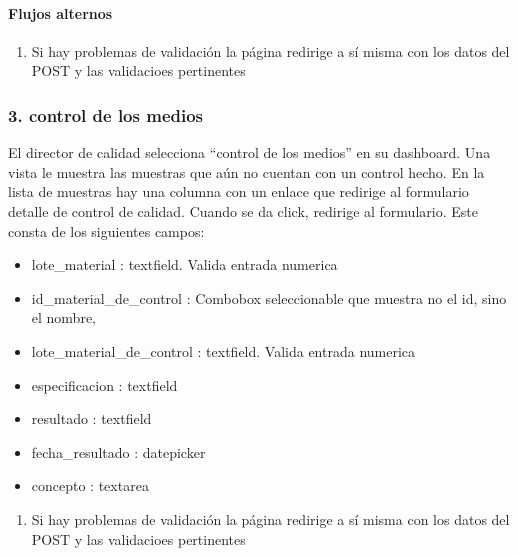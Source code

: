 \documentclass[letterpaper,10pt,spanish]{sphinxmanual}
\begin{document}
\paragraph{Flujos alternos}
\label{\detokenize{requerimientos/srs:id1}}\begin{enumerate}
%
\item {} 
Si hay problemas de validación la página redirige a sí misma con
los datos del POST y las validacioes pertinentes

\end{enumerate}


\subsubsection{3. control de los medios}
\label{\detokenize{requerimientos/srs:control-de-los-medios}}
El director de calidad selecciona “control de los medios” en su dashboard.
Una vista le muestra las muestras que aún no cuentan con un control hecho.
En la lista de muestras hay una columna con un enlace que redirige al formulario
detalle de control de calidad. Cuando se da click, redirige al formulario. Este
consta de los siguientes campos:
\begin{itemize}
\item {} 
lote\_material : textfield. Valida entrada numerica

\item {} 
id\_material\_de\_control : Combobox seleccionable que muestra no el id, sino el nombre,

\item {} 
lote\_material\_de\_control : textfield. Valida entrada numerica

\item {} 
especificacion :  textfield

\item {} 
resultado : textfield

\item {} 
fecha\_resultado : datepicker

\item {} 
concepto : textarea

\end{itemize}
\begin{enumerate}
%
\item {} 
Si hay problemas de validación la página redirige a sí misma con
los datos del POST y las validacioes pertinentes

\end{enumerate}
\end{document}
